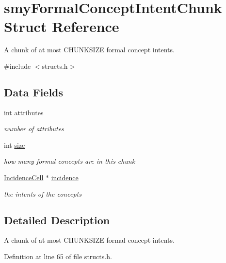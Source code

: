 \hypertarget{structsmyFormalConceptIntentChunk}{\section{smy\-Formal\-Concept\-Intent\-Chunk \-Struct \-Reference}
\label{structsmyFormalConceptIntentChunk}
}


\-A chunk of at most \-C\-H\-U\-N\-K\-S\-I\-Z\-E formal concept intents.  




{\ttfamily \#include $<$structs.\-h$>$}

\subsection*{\-Data \-Fields}
\begin{DoxyCompactItemize}
\item 
int \hyperlink{structsmyFormalConceptIntentChunk_a5246108db3d065d2b9c46fedfc88dc0e}{attributes}
\begin{DoxyCompactList}\small\item\em number of attributes \end{DoxyCompactList}\item 
int \hyperlink{structsmyFormalConceptIntentChunk_a39483f44afbcd1de56c41243c7a442aa}{size}
\begin{DoxyCompactList}\small\item\em how many formal concepts are in this chunk \end{DoxyCompactList}\item 
\hyperlink{easy_8h_a92fa84ef7a12663bb998f141ab729056}{\-Incidence\-Cell} $\ast$ \hyperlink{structsmyFormalConceptIntentChunk_a1777b5eadbd74c4659580968817b3424}{incidence}
\begin{DoxyCompactList}\small\item\em the intents of the concepts \end{DoxyCompactList}\end{DoxyCompactItemize}


\subsection{\-Detailed \-Description}
\-A chunk of at most \-C\-H\-U\-N\-K\-S\-I\-Z\-E formal concept intents. 

\-Definition at line 65 of file structs.\-h.



